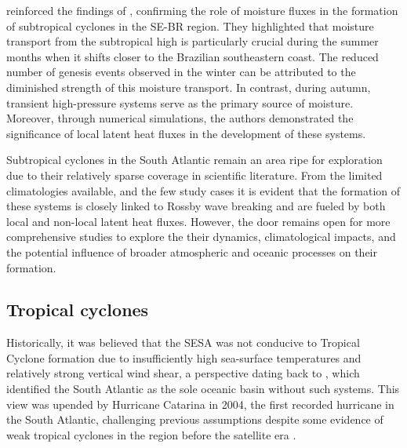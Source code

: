 \citet{gozzo2017climatology} reinforced the findings of \citet{gozzo2014subtropical}, confirming the role of moisture fluxes in the formation of subtropical cyclones in the SE-BR region. They highlighted that moisture transport from the subtropical high is particularly crucial during the summer months when it shifts closer to the Brazilian southeastern coast. The reduced number of genesis events observed in the winter can be attributed to the diminished strength of this moisture transport. In contrast, during autumn, transient high-pressure systems serve as the primary source of moisture. Moreover, through numerical simulations, the authors demonstrated the significance of local latent heat fluxes in the development of these systems.

Subtropical cyclones in the South Atlantic remain an area ripe for exploration due to their relatively sparse coverage in scientific literature. From the limited climatologies available, and the few study cases \citep[e.g.]{reboita2018key,reboita2022shapiro,dias2011energy} it is evident that the formation of these systems is closely linked to Rossby wave breaking and are fueled by both local and non-local latent heat fluxes. However, the door remains open for more comprehensive studies to explore the their dynamics, climatological impacts, and the potential influence of broader atmospheric and oceanic processes on their formation.


\subsection{Tropical cyclones}

Historically, it was believed that the SESA was not conducive to Tropical Cyclone formation due to insufficiently high sea-surface temperatures and relatively strong vertical wind shear, a perspective dating back to \citet{gray1968global}, which identified the South Atlantic as the sole oceanic basin without such systems. This view was upended by Hurricane Catarina in 2004, the first recorded hurricane in the South Atlantic, challenging previous assumptions despite some evidence of weak tropical cyclones in the region before the satellite era \citep{dasilva2004ciclone}.

